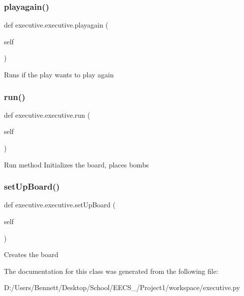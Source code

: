 \subsubsection{\texorpdfstring{playagain()}{playagain()}}
{\footnotesize\ttfamily def executive.\+executive.\+playagain (\begin{DoxyParamCaption}\item[{}]{self }\end{DoxyParamCaption})}

\begin{DoxyVerb}Runs if the play wants to play again
\end{DoxyVerb}
 \mbox{\label{classexecutive_1_1executive_abe92cddf119081cac6c747858df061d7}} 
\subsubsection{\texorpdfstring{run()}{run()}}
{\footnotesize\ttfamily def executive.\+executive.\+run (\begin{DoxyParamCaption}\item[{}]{self }\end{DoxyParamCaption})}

\begin{DoxyVerb}Run method
Initializes the board, places bombs
\end{DoxyVerb}
 \mbox{\label{classexecutive_1_1executive_ae2161d95542ae653323bbfb9ae0ac27b}} 
\subsubsection{\texorpdfstring{set\+Up\+Board()}{setUpBoard()}}
{\footnotesize\ttfamily def executive.\+executive.\+set\+Up\+Board (\begin{DoxyParamCaption}\item[{}]{self }\end{DoxyParamCaption})}

\begin{DoxyVerb}Creates the board
\end{DoxyVerb}
 

The documentation for this class was generated from the following file\+:\begin{DoxyCompactItemize}
\item 
D\+:/\+Users/\+Bennett/\+Desktop/\+School/\+E\+E\+C\+S\+\_/\+Project1/workspace/executive.\+py\end{DoxyCompactItemize}
